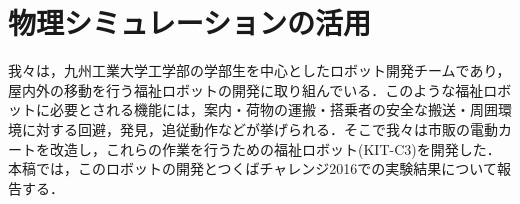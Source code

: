 \documentclass[10pt,a4paper]{jarticle}
\begin{document}
\section{物理シミュレーションの活用}
\label{sec:simulation}
我々は，九州工業大学工学部の学部生を中心としたロボット開発チームであり，屋内外の移動を行う福祉ロボットの開発に取り組んでいる．このような福祉ロボットに必要とされる機能には，案内・荷物の運搬・搭乗者の安全な搬送・周囲環境に対する回避，発見，追従動作などが挙げられる．そこで我々は市販の電動カートを改造し，これらの作業を行うための福祉ロボット(KIT-C3)を開発した．本稿では，このロボットの開発とつくばチャレンジ2016での実験結果について報告する．
\end{document}
